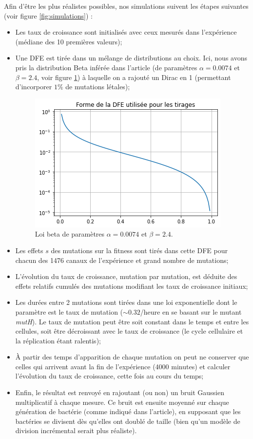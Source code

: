 \documentclass[12pt]{article}
\begin{document}
Afin d'être les plus réalistes possibles, nos simulations suivent les étapes suivantes (voir figure \ref{fig:simulations}) :
\begin{itemize}
\item Les taux de croissance sont initialisés avec ceux mesurés dans l'expérience (médiane des 10 premières valeurs);
\item Une DFE est tirée dans un mélange de distributions au choix. Ici, nous avons pris la distribution Beta inférée dans l'article (de paramètres $\alpha=0.0074$ et $\beta=2.4$, voir figure \ref{fig:lbeta}) à laquelle on a rajouté un Dirac en 1 (permettant d'incorporer $1\%$ de mutations létales);
  \begin{figure}[h]
    \begin{center}
      \includegraphics[scale=0.5]{./img/lbeta.png}
    \end{center} 
    \caption{\label{fig:lbeta}Loi beta de paramètres $\alpha=0.0074$ et $\beta=2.4$.}
  \end{figure}
\item Les effets $s$ des mutations sur la fitness sont tirés dans cette DFE pour chacun des 1476 canaux de l'expérience et grand nombre de mutations;
\item L'évolution du taux de croissance, mutation par mutation, est déduite des effets relatifs cumulés des mutations modifiant les taux de croissance initiaux;
\item Les durées entre 2 mutations sont tirées dans une loi exponentielle dont le paramètre est le taux de mutation ($\sim0.32$/heure en se basant sur le mutant \emph{mutH}). Le taux de mutation peut être soit constant dans le temps et entre les cellules, soit être décroissant avec le taux de croissance (le cycle cellulaire et la réplication étant ralentis);
\item À partir des temps d'apparition de chaque mutation on peut ne conserver que celles qui arrivent avant la fin de l'expérience (4000 minutes) et calculer l'évolution du taux de croissance, cette fois au cours du temps;
\item Enfin, le résultat est renvoyé en rajoutant (ou non) un bruit Gaussien multiplicatif à chaque mesure. Ce bruit est ensuite moyenné sur chaque génération de bactérie (comme indiqué dans l'article), en supposant que les bactéries se divisent dès qu'elles ont doublé de taille (bien qu'un modèle de division incrémental serait plus réaliste).
\end{itemize}
\end{document}
